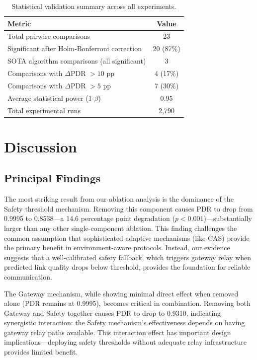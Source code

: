 \documentclass[sensors,article,submit,moreauthors,pdftex]{Definitions/mdpi}
\begin{document}
\begin{table}[H]
\caption{Statistical validation summary across all experiments.}
\label{tab:statistical}
\centering
\begin{tabular}{lc}
\toprule
\textbf{Metric} & \textbf{Value} \\
\midrule
Total pairwise comparisons & 23 \\
Significant after Holm-Bonferroni correction & 20 (87\%) \\
SOTA algorithm comparisons (all significant) & 3 \\
Comparisons with $\Delta$PDR $> 10$ pp & 4 (17\%) \\
Comparisons with $\Delta$PDR $> 5$ pp & 7 (30\%) \\
Average statistical power (1-$\beta$) & 0.95 \\
Total experimental runs & 2,790 \\
\bottomrule
\end{tabular}
\end{table}

\section{Discussion}\label{sec:discussion}

\subsection{Principal Findings}

The most striking result from our ablation analysis is the dominance of the Safety threshold mechanism. Removing this component causes PDR to drop from 0.9995 to 0.8538---a 14.6 percentage point degradation ($p < 0.001$)---substantially larger than any other single-component ablation. This finding challenges the common assumption that sophisticated adaptive mechanisms (like CAS) provide the primary benefit in environment-aware protocols. Instead, our evidence suggests that a well-calibrated safety fallback, which triggers gateway relay when predicted link quality drops below threshold, provides the foundation for reliable communication.

The Gateway mechanism, while showing minimal direct effect when removed alone (PDR remains at 0.9995), becomes critical in combination. Removing both Gateway and Safety together causes PDR to drop to 0.9310, indicating synergistic interaction: the Safety mechanism's effectiveness depends on having gateway relay paths available. This interaction effect has important design implications---deploying safety thresholds without adequate relay infrastructure provides limited benefit.
\end{document}
